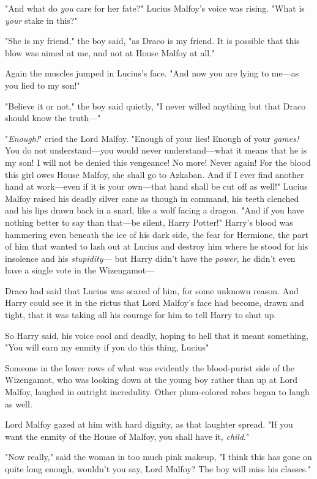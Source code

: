 "And what do \emph{you} care for her fate?" Lucius Malfoy's voice was rising.
"What is \emph{your} stake in this?"

"She is my friend," the boy said, "as Draco is my friend. It is possible that
this blow was aimed at me, and not at House Malfoy at all."

Again the muscles jumped in Lucius's face. "And now you are lying to me---as
you lied to my son!"

"Believe it or not," the boy said quietly, "I never willed anything but that
Draco should know the truth\mbox{---}"

"\emph{Enough!}" cried the Lord Malfoy. "Enough of your lies! Enough of your
\emph{games!} You do not understand---you would never understand---what it
means that he is my son! I will not be denied this vengeance! No more! Never
again! For the blood this girl owes House Malfoy, she shall go to Azkaban. And
if I ever find another hand at work---even if it is your own---that hand shall
be cut off as well!" Lucius Malfoy raised his deadly silver cane as though in
command, his teeth clenched and his lips drawn back in a snarl, like a wolf
facing a dragon. "And if you have nothing better to say than that---be silent,
Harry Potter!"
\sbreak
Harry's blood was hammering even beneath the ice of his dark side, the fear for
Hermione, the part of him that wanted to lash out at Lucius and destroy him
where he stood for his insolence and his \emph{stupidity---} but Harry didn't
have the \emph{power,} he didn't even have a single vote in the Wizengamot---

Draco had said that Lucius was scared of him, for some unknown reason. And
Harry could see it in the rictus that Lord Malfoy's face had become, drawn and
tight, that it was taking all his courage for him to tell Harry to shut up.

So Harry said, his voice cool and deadly, hoping to hell that it meant
something, "You will earn my enmity if you do this thing, Lucius{\el}"

Someone in the lower rows of what was evidently the blood-purist side of the
Wizengamot, who was looking down at the young boy rather than up at Lord
Malfoy, laughed in outright incredulity. Other plum-colored robes began to
laugh as well.

Lord Malfoy gazed at him with hard dignity, as that laughter spread. "If you
want the enmity of the House of Malfoy, you shall have it, \emph{child}."

"Now really," said the woman in too much pink makeup, "I think this has gone on
quite long enough, wouldn't you say, Lord Malfoy? The boy will miss his
classes."

